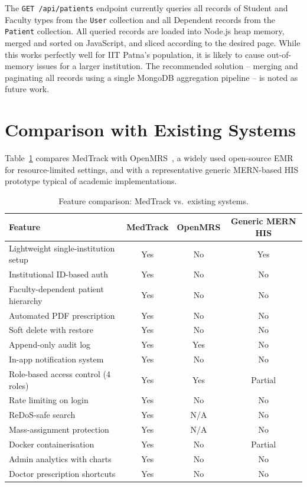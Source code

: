 The \texttt{GET /api/patients} endpoint currently queries all
records of Student and Faculty types from the \texttt{User}
collection and all Dependent records from the \texttt{Patient}
collection. All queried records are loaded into Node.js heap memory,
merged and sorted on JavaScript, and sliced according to the desired
page. While this works perfectly well for IIT Patna's population,
it is likely to cause out-of-memory issues for a larger institution.
The recommended solution -- merging and paginating all records using
a single MongoDB aggregation pipeline -- is noted as future work.

\section{Comparison with Existing Systems}

Table~\ref{tab:comparison} compares MedTrack with OpenMRS~\cite{OpenMRS2006},
a widely used open-source EMR for resource-limited settings, and with a
representative generic MERN-based HIS prototype typical of academic
implementations.

\begin{table}[htbp]
  \centering
  \caption{Feature comparison: MedTrack vs.\ existing systems.}
  \label{tab:comparison}
  \begin{tabularx}{\textwidth}{Xccc}
    \hline
    \textbf{Feature} & \textbf{MedTrack} & \textbf{OpenMRS}
                     & \textbf{Generic MERN HIS} \\
    \hline
    Lightweight single-institution setup  & Yes & No  & Yes \\
    Institutional ID-based auth           & Yes & No  & No  \\
    Faculty-dependent patient hierarchy   & Yes & No  & No  \\
    Automated PDF prescription            & Yes & No  & No  \\
    Soft delete with restore              & Yes & No  & No  \\
    Append-only audit log                 & Yes & Yes & No  \\
    In-app notification system            & Yes & No  & No  \\
    Role-based access control (4 roles)   & Yes & Yes & Partial \\
    Rate limiting on login                & Yes & No  & No  \\
    ReDoS-safe search                     & Yes & N/A & No  \\
    Mass-assignment protection            & Yes & N/A & No  \\
    Docker containerisation               & Yes & No  & Partial \\
    Admin analytics with charts           & Yes & No  & No  \\
    Doctor prescription shortcuts         & Yes & No  & No  \\
    \hline
  \end{tabularx}
\end{table}

